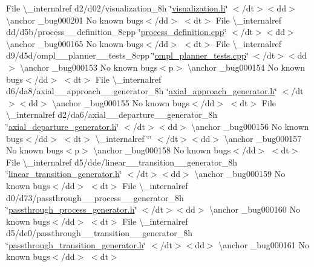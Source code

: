 \begin{DoxyRefList}
\+File \textbackslash{}\+\_\+internalref d2/d02/visualization\+\_\+8h \char`\"{}\mbox{\hyperlink{visualization_8h}{visualization.\+h}}\char`\"{} $<$/dt$>$$<$dd$>$ \textbackslash{}anchor \+\_\+bug000201 No known bugs$<$/dd$>$ $<$dt$>$
\+File \textbackslash{}\+\_\+internalref dd/d5b/process\+\_\+\+\_\+definition\+\_\+8cpp \char`\"{}\mbox{\hyperlink{process__definition_8cpp}{process\+\_\+definition.\+cpp}}\char`\"{} $<$/dt$>$$<$dd$>$ \textbackslash{}anchor \+\_\+bug000165 No known bugs$<$/dd$>$ $<$dt$>$
\+File \textbackslash{}\+\_\+internalref d9/d5d/ompl\+\_\+\+\_\+planner\+\_\+\+\_\+tests\+\_\+8cpp \char`\"{}\mbox{\hyperlink{ompl__planner__tests_8cpp}{ompl\+\_\+planner\+\_\+tests.\+cpp}}\char`\"{} $<$/dt$>$$<$dd$>$ \textbackslash{}anchor \+\_\+bug000153 No known bugs$<$p$>$ \textbackslash{}anchor \+\_\+bug000154 No known bugs$<$/dd$>$ $<$dt$>$
\+File \textbackslash{}\+\_\+internalref d6/da8/axial\+\_\+\+\_\+approach\+\_\+\+\_\+generator\+\_\+8h \char`\"{}\mbox{\hyperlink{axial__approach__generator_8h}{axial\+\_\+approach\+\_\+generator.\+h}}\char`\"{} $<$/dt$>$$<$dd$>$ \textbackslash{}anchor \+\_\+bug000155 No known bugs$<$/dd$>$ $<$dt$>$
\+File \textbackslash{}\+\_\+internalref d2/da6/axial\+\_\+\+\_\+departure\+\_\+\+\_\+generator\+\_\+8h \char`\"{}\mbox{\hyperlink{axial__departure__generator_8h}{axial\+\_\+departure\+\_\+generator.\+h}}\char`\"{} $<$/dt$>$$<$dd$>$ \textbackslash{}anchor \+\_\+bug000156 No known bugs$<$/dd$>$ $<$dt$>$
 \textbackslash{}\+\_\+internalref  \char`\"{}\char`\"{} $<$/dt$>$$<$dd$>$ \textbackslash{}anchor \+\_\+bug000157 No known bugs$<$p$>$ \textbackslash{}anchor \+\_\+bug000158 No known bugs$<$/dd$>$ $<$dt$>$
\+File \textbackslash{}\+\_\+internalref d5/dde/linear\+\_\+\+\_\+transition\+\_\+\+\_\+generator\+\_\+8h \char`\"{}\mbox{\hyperlink{linear__transition__generator_8h}{linear\+\_\+transition\+\_\+generator.\+h}}\char`\"{} $<$/dt$>$$<$dd$>$ \textbackslash{}anchor \+\_\+bug000159 No known bugs$<$/dd$>$ $<$dt$>$
\+File \textbackslash{}\+\_\+internalref d0/d73/passthrough\+\_\+\+\_\+process\+\_\+\+\_\+generator\+\_\+8h \char`\"{}\mbox{\hyperlink{passthrough__process__generator_8h}{passthrough\+\_\+process\+\_\+generator.\+h}}\char`\"{} $<$/dt$>$$<$dd$>$ \textbackslash{}anchor \+\_\+bug000160 No known bugs$<$/dd$>$ $<$dt$>$
\+File \textbackslash{}\+\_\+internalref d5/de0/passthrough\+\_\+\+\_\+transition\+\_\+\+\_\+generator\+\_\+8h \char`\"{}\mbox{\hyperlink{passthrough__transition__generator_8h}{passthrough\+\_\+transition\+\_\+generator.\+h}}\char`\"{} $<$/dt$>$$<$dd$>$ \textbackslash{}anchor \+\_\+bug000161 No known bugs$<$/dd$>$ $<$dt$>$
$$
\end{DoxyRefList}
